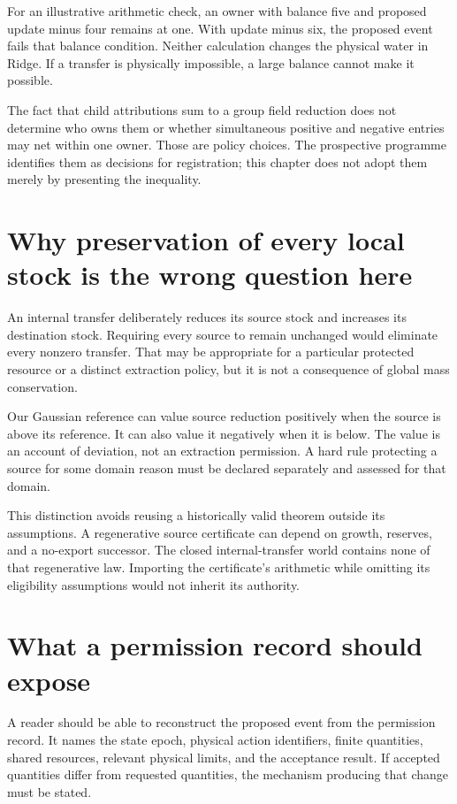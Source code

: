 For an illustrative arithmetic check, an owner with balance five and proposed update minus four remains at one. With update minus six, the proposed event fails that balance condition. Neither calculation changes the physical water in Ridge. If a transfer is physically impossible, a large balance cannot make it possible.

The fact that child attributions sum to a group field reduction does not determine who owns them or whether simultaneous positive and negative entries may net within one owner. Those are policy choices. The prospective programme identifies them as decisions for registration; this chapter does not adopt them merely by presenting the inequality.

\section{Why preservation of every local stock is the wrong question here}
An internal transfer deliberately reduces its source stock and increases its destination stock. Requiring every source to remain unchanged would eliminate every nonzero transfer. That may be appropriate for a particular protected resource or a distinct extraction policy, but it is not a consequence of global mass conservation.

Our Gaussian reference can value source reduction positively when the source is above its reference. It can also value it negatively when it is below. The value is an account of deviation, not an extraction permission. A hard rule protecting a source for some domain reason must be declared separately and assessed for that domain.

This distinction avoids reusing a historically valid theorem outside its assumptions. A regenerative source certificate can depend on growth, reserves, and a no-export successor. The closed internal-transfer world contains none of that regenerative law. Importing the certificate's arithmetic while omitting its eligibility assumptions would not inherit its authority.

\section{What a permission record should expose}
A reader should be able to reconstruct the proposed event from the permission record. It names the state epoch, physical action identifiers, finite quantities, shared resources, relevant physical limits, and the acceptance result. If accepted quantities differ from requested quantities, the mechanism producing that change must be stated.

